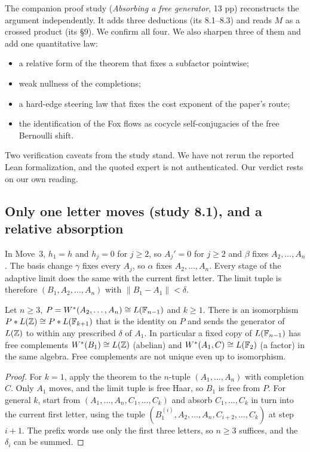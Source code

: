 \label{sec:deductions}
The companion proof study (\emph{Absorbing a free generator}, 13 pp) reconstructs the argument independently. It adds three deductions
(its 8.1--8.3) and reads $M$ as a crossed product (its \S9). We confirm all four. We also sharpen three of them and add one quantitative law:
\begin{itemize}[leftmargin=*]
\item a relative form of the theorem that fixes a subfactor pointwise;
\item weak nullness of the completions;
\item a hard-edge steering law that fixes the cost exponent of the paper's route;
\item the identification of the Fox flows as cocycle self-conjugacies of the free Bernoulli shift.
\end{itemize}
Two verification caveats from the study stand. We have not rerun the reported Lean formalization, and the quoted expert is not
authenticated. Our verdict rests on our own reading.

\subsection{Only one letter moves (study 8.1), and a relative absorption}
In Move~3, $h_1=h$ and $h_j=0$ for $j\ge2$, so $A_j'=0$ for $j\ge2$ and $\beta$ fixes $A_2,\dots,A_n$. The basis change $\gamma$ fixes every $A_j$, so $\alpha$
fixes $A_2,\dots,A_n$. Every stage of the adaptive limit does the same with the current first letter. The limit tuple is therefore
$(B_1,A_2,\dots,A_n)$ with $\|B_1-A_1\|<\delta$.
\begin{corollary}
Let $n\ge3$, $P=W^*(A_2,\dots,A_n)\cong L(\mathbb F_{n-1})$ and $k\ge1$. There is an isomorphism $P*L(\mathbb Z)\cong P*L(\mathbb F_{k+1})$ that is the identity on $P$ and
sends the generator of $L(\mathbb Z)$ to within any prescribed $\delta$ of $A_1$. In particular a fixed copy of $L(\mathbb F_{n-1})$ has free complements
$W^*(B_1)\cong L(\mathbb Z)$ (abelian) and $W^*(A_1,C)\cong L(\mathbb F_2)$ (a factor) in the same algebra. Free complements are not unique even up to isomorphism.
\end{corollary}
\begin{proof}
For $k=1$, apply the theorem to the $n$-tuple $(A_1,\dots,A_n)$ with completion $C$. Only $A_1$ moves, and the limit tuple is free Haar, so $B_1$ is
free from $P$. For general $k$, start from $(A_1,\dots,A_n,C_1,\dots,C_k)$ and absorb $C_1,\dots,C_k$ in turn into the current first letter, using the
tuple $(B_1^{(i)},A_2,\dots,A_n,C_{i+2},\dots,C_k)$ at step $i+1$. The prefix words use only the first three letters, so $n\ge3$ suffices, and the
$\delta_i$ can be summed.
\end{proof}


